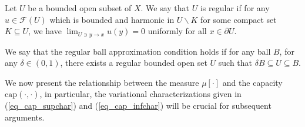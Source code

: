 \documentclass[11pt,a4paper]{article}
\numberwithin{equation}{section}
\theoremstyle{plain}
\theoremstyle{definition}
\begin{document}
Let $U$ be a bounded open subset of $X$. We say that $U$ is regular if for any $u\in \mathcal{F}(U)$ which is bounded and harmonic in $U\backslash K$ for some compact set $K\subseteq U$, we have $\lim_{U\ni y\to x}u(y)=0$ uniformly for all $x\in \partial U$.

We say that the regular ball approximation condition \hypertarget{eq_RBA}{} holds if for any ball $B$, for any $\delta\in(0,1)$, there exists a regular bounded open set $U$ such that $\delta B\subseteq U\subseteq B$.

We now present the relationship between the measure $\mu[\cdot]$ and the capacity $\mathrm{cap}(\cdot,\cdot)$, in particular, the variational characterizations given in (\ref{eq_cap_supchar}) and (\ref{eq_cap_infchar}) will be crucial for subsequent arguments.
\end{document}
